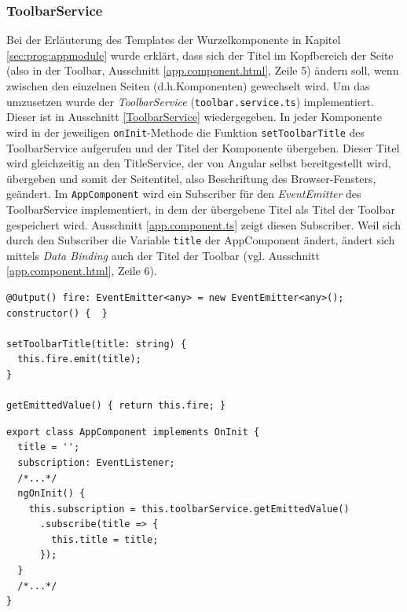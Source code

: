 \subsubsection{ToolbarService}
\label{sec:prog:modules:toolbar}
Bei der Erläuterung des Templates der Wurzelkomponente in Kapitel \ref{sec:prog:appmodule} wurde erklärt, dass sich der Titel im Kopfbereich der Seite (also in der Toolbar, Ausschnitt \ref{app.component.html}, Zeile 5) ändern soll, wenn zwischen den einzelnen Seiten (d.h.Komponenten) gewechselt wird. Um das umzusetzen wurde der \textit{ToolbarService} (\texttt{toolbar.service.ts}) implementiert. Dieser ist in Ausschnitt \ref{ToolbarService} wiedergegeben. In jeder Komponente wird in der jeweiligen \texttt{onInit}-Methode die Funktion \texttt{setToolbarTitle} des ToolbarService aufgerufen und der Titel der Komponente übergeben. Dieser Titel wird gleichzeitig an den TitleService, der von Angular selbst bereitgestellt wird, übergeben und somit der Seitentitel, also Beschriftung des Browser-Fensters, geändert. Im \texttt{AppComponent} wird ein Subscriber für den \textit{EventEmitter} des ToolbarService implementiert, in dem der übergebene Titel als Titel der Toolbar gespeichert wird. Ausschnitt \ref{app.component.ts} zeigt diesen Subscriber. Weil sich durch den Subscriber die Variable \texttt{title} der AppComponent ändert, ändert sich mittels \textit{Data Binding} auch der Titel der Toolbar (vgl. Ausschnitt \ref{app.component.html}, Zeile 6).

\begin{lstlisting}[float, floatplacement=h, style=htmlcssjs, caption={Ausschnitt aus \texttt{ToolBarService}}, label={ToolbarService}]
@Output() fire: EventEmitter<any> = new EventEmitter<any>();
constructor() {  }

setToolbarTitle(title: string) {
  this.fire.emit(title);
}

getEmittedValue() { return this.fire; }
\end{lstlisting}

\begin{lstlisting}[float, floatplacement=h, style=htmlcssjs, caption={``Abonnieren`` des \texttt{ToolbarService} im  \texttt{AppComponent}}, label={app.component.ts}]
export class AppComponent implements OnInit {
  title = '';
  subscription: EventListener;
  /*...*/
  ngOnInit() {
    this.subscription = this.toolbarService.getEmittedValue()
      .subscribe(title => {
        this.title = title;
      });
  }
  /*...*/
}
\end{lstlisting}

